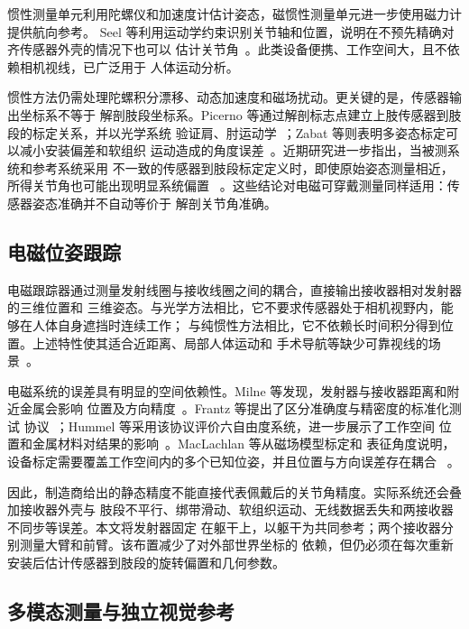 惯性测量单元利用陀螺仪和加速度计估计姿态，磁惯性测量单元进一步使用磁力计提供航向参考。
Seel 等利用运动学约束识别关节轴和位置，说明在不预先精确对齐传感器外壳的情况下也可以
估计关节角~\cite{seel2014imu}。此类设备便携、工作空间大，且不依赖相机视线，已广泛用于
人体运动分析。

惯性方法仍需处理陀螺积分漂移、动态加速度和磁场扰动。更关键的是，传感器输出坐标系不等于
解剖肢段坐标系。Picerno 等通过解剖标志点建立上肢传感器到肢段的标定关系，并以光学系统
验证肩、肘运动学~\cite{picerno2019upper}；Zabat 等则表明多姿态标定可以减小安装偏差和软组织
运动造成的角度误差~\cite{zabat2019multiple}。近期研究进一步指出，当被测系统和参考系统采用
不一致的传感器到肢段标定定义时，即使原始姿态测量相近，所得关节角也可能出现明显系统偏置
~\cite{adjel2025influence}。这些结论对电磁可穿戴测量同样适用：传感器姿态准确并不自动等价于
解剖关节角准确。

\subsection{电磁位姿跟踪}
\label{subsec:ch2_em_tracking}

电磁跟踪器通过测量发射线圈与接收线圈之间的耦合，直接输出接收器相对发射器的三维位置和
三维姿态。与光学方法相比，它不要求传感器处于相机视野内，能够在人体自身遮挡时连续工作；
与纯惯性方法相比，它不依赖长时间积分得到位置。上述特性使其适合近距离、局部人体运动和
手术导航等缺少可靠视线的场景~\cite{maclachlan2025calibration}。

电磁系统的误差具有明显的空间依赖性。Milne 等发现，发射器与接收器距离和附近金属会影响
位置及方向精度~\cite{milne1996accuracy}。Frantz 等提出了区分准确度与精密度的标准化测试
协议~\cite{frantz2003accuracy}；Hummel 等采用该协议评价六自由度系统，进一步展示了工作空间
位置和金属材料对结果的影响~\cite{hummel2006evaluation}。MacLachlan 等从磁场模型标定和
表征角度说明，设备标定需要覆盖工作空间内的多个已知位姿，并且位置与方向误差存在耦合
~\cite{maclachlan2025calibration}。

因此，制造商给出的静态精度不能直接代表佩戴后的关节角精度。实际系统还会叠加接收器外壳与
肢段不平行、绑带滑动、软组织运动、无线数据丢失和两接收器不同步等误差。本文将发射器固定
在躯干上，以躯干为共同参考；两个接收器分别测量大臂和前臂。该布置减少了对外部世界坐标的
依赖，但仍必须在每次重新安装后估计传感器到肢段的旋转偏置和几何参数。

\subsection{多模态测量与独立视觉参考}
\label{subsec:ch2_multimodal_reference}

